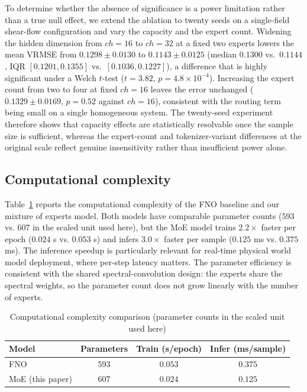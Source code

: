 \documentclass[preprint,12pt]{elsarticle}
\begin{document}
To determine whether the absence of significance is a power limitation rather than a true null effect, we extend the ablation to twenty seeds on a single-field shear-flow configuration and vary the capacity and the expert count. Widening the hidden dimension from $ch=16$ to $ch=32$ at a fixed two experts lowers the mean VRMSE from $0.1298\pm0.0130$ to $0.1143\pm0.0125$ (median $0.1300$ vs.\ $0.1144$, IQR $[0.1201,0.1355]$ vs.\ $[0.1036,0.1227]$), a difference that is highly significant under a Welch $t$-test ($t=3.82$, $p=4.8\times10^{-4}$). Increasing the expert count from two to four at fixed $ch=16$ leaves the error unchanged ($0.1329\pm0.0169$, $p=0.52$ against $ch=16$), consistent with the routing term being small on a single homogeneous system. The twenty-seed experiment therefore shows that capacity effects are statistically resolvable once the sample size is sufficient, whereas the expert-count and tokenizer-variant differences at the original scale reflect genuine insensitivity rather than insufficient power alone.

\subsection{Computational complexity}
Table~\ref{tab:m6} reports the computational complexity of the FNO baseline and our mixture of experts model. Both models have comparable parameter counts ($593$ vs. $607$ in the scaled unit used here), but the MoE model trains $2.2\times$ faster per epoch ($0.024$ s vs. $0.053$ s) and infers $3.0\times$ faster per sample ($0.125$ ms vs. $0.375$ ms). The inference speedup is particularly relevant for real-time physical world model deployment, where per-step latency matters. The parameter efficiency is consistent with the shared spectral-convolution design: the experts share the spectral weights, so the parameter count does not grow linearly with the number of experts.

\begin{table}[t]
\centering
\small
\caption{Computational complexity comparison (parameter counts in the scaled unit used here)}
\label{tab:m6}
\begin{tabular}{lccc}
\toprule
Model & Parameters & Train (s/epoch) & Infer (ms/sample) \\
\midrule
FNO & 593 & $0.053$ & $0.375$ \\
MoE (this paper) & 607 & $0.024$ & $0.125$ \\
\bottomrule
\end{tabular}
\end{table}
\end{document}
